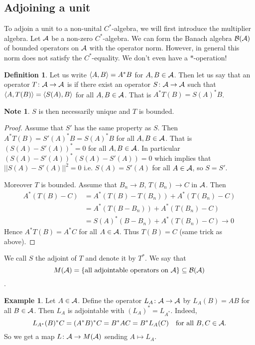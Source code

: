 \documentclass[10pt,english,a4paper]{article}
\theoremstyle{definition}
\newtheorem*{definition}{Definition}
\newtheorem*{example}{Example}
\newtheorem*{note}{Note}
\let\emph\relax %
\begin{document}
\subsection{Adjoining a unit}


To adjoin a unit to a non-unital $C^*$-algebra, we will first introduce the multiplier 
algebra. Let $\mathcal{A}$ be a non-zero $C^*$-algebra. We can form the Banach algebra 
$\mathcal{B}(\mathcal{A})$ of bounded operators on $\mathcal{A}$ with the operator norm. However, in 
general this norm does not satisfy the $C^*$-equality. We don't even have a 
$*$-operation! 

\begin{definition}
    
Let us write $\left\langle A,B \right\rangle = A^*B$ for $A,B \in \mathcal{A}$. Then let us
say that an operator 
$ T \colon \mathcal{A} \to \mathcal{A}$ is \emph{adjointable}
if there exist an operator $S\colon \mathcal{A} \to \mathcal{A}$ such that $\left\langle A,T(B) \right\rangle= \left\langle S(A), B \right\rangle$
for all $A,B \in \mathcal{A}$. That is $A^*T(B) = S(A)^*B$.
\end{definition}


\begin{note}
    $S$ is then necessarily unique and $T$ is bounded.
\end{note}
\begin{proof}
    Assume that $S'$ has the same property as $S$. Then $A^* T(B) = S'(A)^*B = S(A)^*B$
for all $A,B \in \mathcal{A}$. That is $(S(A)-S'(A))^*= 0$ for all $A,B \in \mathcal{A}$. In particular 
$(S(A) -S'(A))^*(S(A)-S'(A)) =0$ which implies that $||S(A)-S'(A)||^2 = 0$ i.e.
$S(A)=S'(A)$ for all $A \in \mathcal{A}$, so $S = S'$.

Moreover $T$ is bounded. 
Assume that $B_n \to B$, $T(B_n) \to C$ in $\mathcal{A}$. Then 
\begin{align*}
A^*(T(B)-C) &=
A^* (T(B)-T(B_n)) + A^*(T(B_n)-C) \\
&= A^*(T(B-B_n)) + A^*(T(B_n)-C) \\ &= S(A)^*(B-B_n) + A^*(T(B_n)-C) \to 0
\end{align*}
Hence $A^*T(B) = A^*C $ for all $A \in \mathcal{A}$. Thus $T(B) = C$ (same trick as above).
\end{proof}

We call $S$ the adjoint of $T$ and denote it by $T^*$. We say that 
\[M(\mathcal{A}) = \{\text{all adjointable operators on }\mathcal{A}\} \subseteq \mathcal{B}(\mathcal{A})\].

\begin{example}
    Let $A \in \mathcal{A}$. Define the operator $L_A \colon \mathcal{A}\to\mathcal{A}$ by $L_A(B) = AB$
for all $B \in \mathcal{A}$. Then $L_A$ is adjointable with $(L_{A})^* = L_{A^*}$. 
Indeed, 
\[L_{A^*}(B)^*C  = (A^*B)^*C = B^*AC = B^*L_{A}(C)\quad \text{for all } B, C \in \mathcal{A}.\]
So we get a map $L\colon \mathcal{A} \to M(\mathcal{A})$ sending $A \mapsto L_{A}$. 
\end{example}
\end{document}
